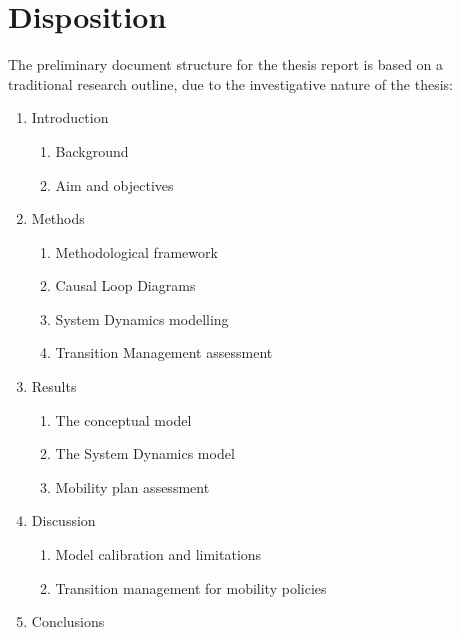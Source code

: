 \documentclass[a4paper,fontsize=11pt,bibliography=totoc]{scrartcl}
\newenvironment{dispositionlist}{%
	\begingroup
	\small
	\begin{enumerate}[label*=\arabic*.]
}{ %
	\end{enumerate}
	\endgroup
}
\begin{document}
\section{Disposition}
The preliminary document structure for the thesis report is based on a traditional research outline, due to the investigative nature of the thesis:

\begin{dispositionlist}
	\item Introduction
		\begin{dispositionlist}
			\item Background
			\item Aim and objectives
		\end{dispositionlist}
	\item Methods
		\begin{dispositionlist}
			\item Methodological framework
			\item Causal Loop Diagrams
			\item System Dynamics modelling
			\item Transition Management assessment
		\end{dispositionlist}
	\item Results
		\begin{dispositionlist}
			\item The conceptual model
			\item The System Dynamics model
			\item Mobility plan assessment
		\end{dispositionlist}
	\item Discussion
		\begin{dispositionlist}
			\item Model calibration and limitations
			\item Transition management for mobility policies
		\end{dispositionlist}
	\item Conclusions
\end{dispositionlist}
\end{document}
